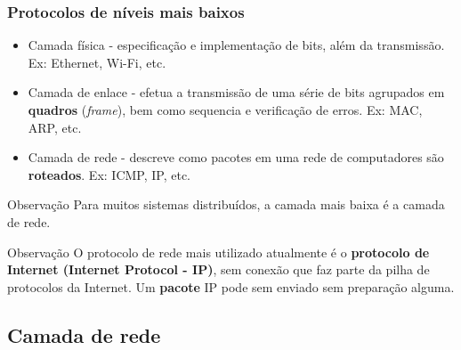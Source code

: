 \documentclass[xcolor=dvipsnames,10pt,compress,aspectratio=169]{beamer}
\newcommand{\blue}[1]{{\color{blue}#1}}
\begin{document}
\begin{frame}
  \frametitle{Protocolos de níveis mais baixos}
  \begin{itemize}
  \item \blue{Camada física} - especificação e implementação de bits, além da transmissão. Ex: Ethernet, Wi-Fi, etc.
  \item \blue{Camada de enlace} - efetua a transmissão de uma série de
    bits agrupados em \textbf{quadros} (\emph{frame}), bem como sequencia e verificação de erros. Ex: MAC, ARP, etc.
  \item \blue{Camada de rede} - descreve como pacotes em uma rede de computadores são 
    \textbf{roteados}. Ex: ICMP, IP, etc.
  \end{itemize}
  \pause
  \begin{alertblock}{Observação}
  Para muitos sistemas distribuídos, a camada mais baixa é a camada de rede.
  \end{alertblock}
  \begin{exampleblock}{Observação}
  O protocolo de rede mais utilizado atualmente é o {\bf protocolo de Internet (Internet Protocol - IP)}, sem conexão
  que faz parte da pilha de protocolos da Internet. Um \textbf{pacote} IP pode sem enviado sem preparação alguma.
  \end{exampleblock}
\end{frame}


\subsection{Camada de rede}
\end{document}
